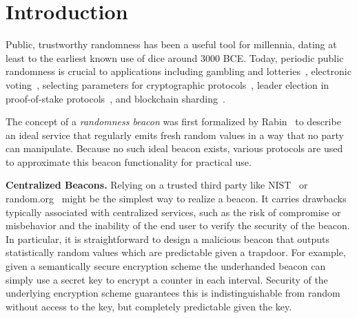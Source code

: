 
\section{Introduction}
\label{sec:intro}

Public, trustworthy randomness has been a useful tool for millennia, dating at least to the earliest known use of dice around 3000 BCE. Today, periodic public randomness is crucial to applications including gambling and lotteries~\cite{bonneau2015bitcoin}, electronic voting~\cite{adida2008helios}, selecting parameters for cryptographic protocols~\cite{baigneres2015trap, lenstra2015random}, leader election in proof-of-stake protocols~\cite{gilad2017algorand, kiayias2017ouroboros}, and blockchain sharding~\cite{al2017chainspace, kokoris2018omniledger}.

The concept of a \emph{randomness beacon} was first formalized by Rabin~\cite{rabin1983Rabin} to describe an ideal service that regularly emits fresh random values in a way that no party can manipulate. Because no such ideal beacon exists, various protocols are used to approximate this beacon functionality for practical use.

\textbf{Centralized Beacons.} Relying on a trusted third party like NIST~\cite{fischer2011public,kelsey2019reference} or random.org~\cite{haahr2010random} might be the simplest way to realize a beacon. It carries drawbacks typically associated with centralized services, such as the risk of compromise or misbehavior and the inability of the end user to verify the security of the beacon.
In particular, it is straightforward to design a malicious beacon that outputs statistically random values which are predictable given a trapdoor. For example, given a semantically secure encryption scheme the underhanded beacon can simply use a secret key to encrypt a counter in each interval.
Security of the underlying encryption scheme guarantees this is indistinguishable from random without access to the key, but completely predictable given the key.

